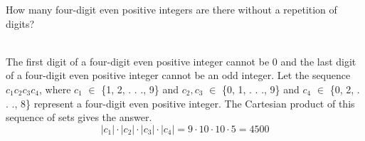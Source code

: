 How many four-digit even positive integers are there without a repetition of digits?

\begin{solution}\ \\
The first digit of a four-digit even positive integer cannot be 0 and the last digit of a four-digit even positive integer cannot be an odd integer. Let the sequence \(c_1c_2c_3c_4\), where \(c_1\) $\in$ \{1, 2, . . ., 9\} and \(c_2, c_3\) $\in$ \{0, 1, . . ., 9\} and \(c_4\) $\in$ \{0, 2, . . ., 8\} represent a four-digit even positive integer. The Cartesian product of this sequence of sets gives the answer. 
\[|c_1| \cdot |c_2| \cdot |c_3| \cdot |c_4| = 9 \cdot 10 \cdot 10 \cdot 5 = 4500\]
\end{solution}